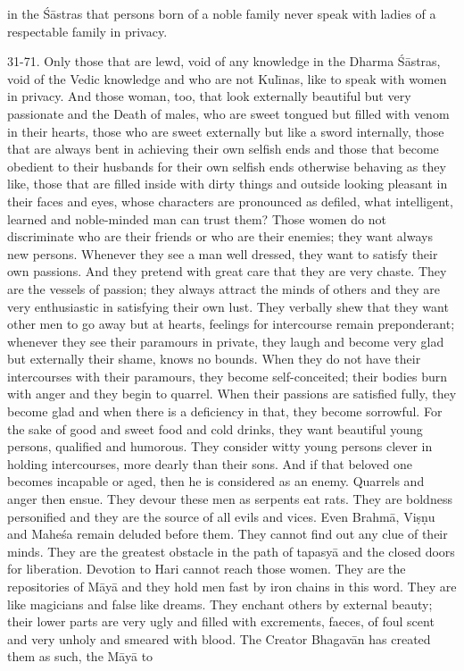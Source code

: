in the \'S\=astras that persons born of a noble family never speak with ladies of a respectable family in privacy.

31-71. Only those that are lewd, void of any knowledge in the Dharma \'S\=astras, void of the Vedic knowledge and who are not Kul\={\i}nas, like to speak with women in privacy. And those woman, too, that look externally beautiful but very passionate and the Death of males, who are sweet tongued but filled with venom in their hearts, those who are sweet externally but like a sword internally, those that are always bent in achieving their own selfish ends and those that become obedient to their husbands for their own selfish ends otherwise behaving as they like, those that are filled inside with dirty things and outside looking pleasant in their faces and eyes, whose characters are pronounced as defiled, what intelligent, learned and noble-minded man can trust them? Those women do not discriminate who are their friends or who are their enemies; they want always new persons. Whenever they see a man well dressed, they want to satisfy their own passions. And they pretend with great care that they are very chaste. They are the vessels of passion; they always attract the minds of others and they are very enthusiastic in satisfying their own lust. They verbally shew that they want other men to go away but at hearts, feelings for intercourse remain preponderant; whenever they see their paramours in private, they laugh and become very glad but externally their shame, knows no bounds. When they do not have their intercourses with their paramours, they become self-conceited; their bodies burn with anger and they begin to quarrel. When their passions are satisfied fully, they become glad and when there is a deficiency in that, they become sorrowful. For the sake of good and sweet food and cold drinks, they want beautiful young persons, qualified and humorous. They consider witty young persons clever in holding intercourses, more dearly than their sons. And if that beloved one becomes incapable or aged, then he is considered as an enemy. Quarrels and anger then ensue. They devour these men as serpents eat rats. They are boldness personified and they are the source of all evils and vices. Even Brahm\=a, Vi\d{s}\d{n}u and Mahe\'sa remain deluded before them. They cannot find out any clue of their minds. They are the greatest obstacle in the path of tapasy\=a and the closed doors for liberation. Devotion to Hari cannot reach those women. They are the repositories of M\=ay\=a and they hold men fast by iron chains in this word. They are like magicians and false like dreams. They enchant others by external beauty; their lower parts are very ugly and filled with excrements, faeces, of foul scent and very unholy and smeared with blood. The Creator Bhagav\=an has created them as such, the M\=ay\=a to

